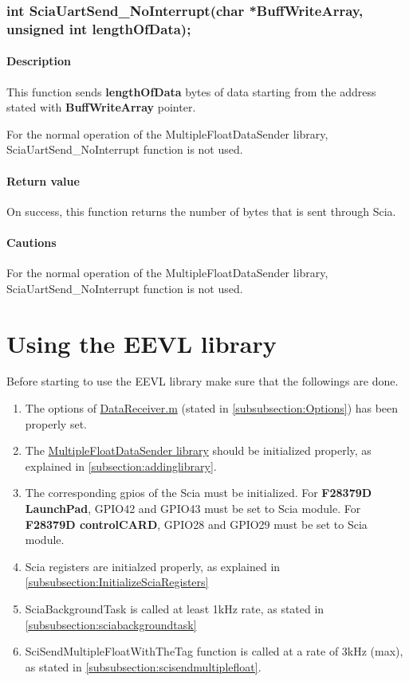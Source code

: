 \documentclass{article}
\begin{document}
\subsubsection{int SciaUartSend\_NoInterrupt(char *BuffWriteArray, unsigned int lengthOfData);}
\begin{addmargin}[4em]{1em}
	\paragraph{Description}
	This function sends \textbf{lengthOfData} bytes of data starting from the address stated with \textbf{BuffWriteArray} pointer. 

	For the normal operation of the MultipleFloatDataSender library, SciaUartSend\_NoInterrupt function is not used. 

	\paragraph{Return value}
	On success, this function returns the number of bytes that is sent through Scia. 
	\paragraph{Cautions}
	For the normal operation of the MultipleFloatDataSender library, SciaUartSend\_NoInterrupt function is not used. 

\end{addmargin}

\section{Using the EEVL library}
Before starting to use the EEVL library make sure that the followings are done.
\begin{enumerate}
	\item The options of \href{https://github.com/hakansrc/fault_tolerant_drives/blob/master/Software/MultipleDataPlot/DataReceiver.m}{DataReceiver.m} (stated in \ref{subsubsection:Options}) has been properly set.
	\item The \href{https://github.com/hakansrc/fault_tolerant_drives/tree/master/Software/MultipleDataPlot/MultipleFloatDataSender}{MultipleFloatDataSender library} should be initialized properly, as explained in \ref{subsection:addinglibrary}.
	\item The corresponding gpios of the Scia must be initialized. For \textbf{F28379D LaunchPad}, GPIO42 and GPIO43 must be set to Scia module. For \textbf{F28379D controlCARD}, GPIO28 and GPIO29 must be set to Scia module. 
	\item Scia registers are initialzed properly, as explained in \ref{subsubsection:InitializeSciaRegisters}
	\item SciaBackgroundTask is called at least 1kHz rate, as stated in \ref{subsubsection:sciabackgroundtask}
	\item SciSendMultipleFloatWithTheTag function is called at a rate of 3kHz (max), as stated in \ref{subsubsection:scisendmultiplefloat}.
\end{enumerate}
\end{document}

